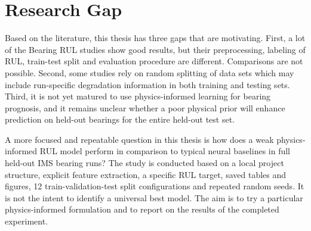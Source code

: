 \section{Research Gap}

Based on the literature, this thesis has three gaps that are motivating. First, a lot of the Bearing RUL studies show good results, but their preprocessing, labeling of RUL, train-test split and evaluation procedure are different. Comparisons are not possible. Second, some studies rely on random splitting of data sets which may include run-specific degradation information in both training and testing sets. Third, it is not yet matured to use physics-informed learning for bearing prognosis, and it remains unclear whether a poor physical prior will enhance prediction on held-out bearings for the entire held-out test set.

A more focused and repeatable question in this thesis is how does a weak physics-informed RUL model perform in comparison to typical neural baselines in full held-out IMS bearing runs? The study is conducted based on a local project structure, explicit feature extraction, a specific RUL target, saved tables and figures, 12 train-validation-test split configurations and repeated random seeds. It is not the intent to identify a universal best model. The aim is to try a particular physics-informed formulation and to report on the results of the completed experiment.
